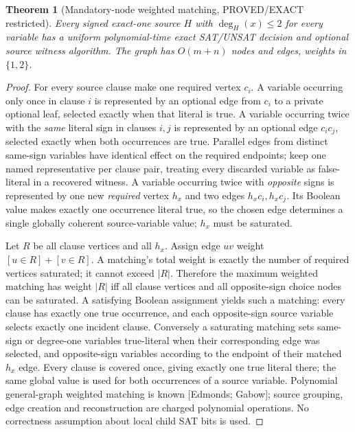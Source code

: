 \documentclass[11pt]{article}
\newtheorem{theorem}{Theorem}
\begin{document}
\begin{theorem}[Mandatory-node weighted matching, PROVED/EXACT restricted]
Every signed exact-one source $H$ with $\deg_H(x)\le2$ for every variable has a uniform polynomial-time exact SAT/UNSAT decision and optional source witness algorithm. The graph has $O(m+n)$ nodes and edges, weights in $\{1,2\}$.
\end{theorem}
\begin{proof}
For every source clause make one required vertex $c_i$. A variable occurring only once in clause $i$ is represented by an optional edge from $c_i$ to a private optional leaf, selected exactly when that literal is true. A variable occurring twice with the \emph{same} literal sign in clauses $i,j$ is represented by an optional edge $c_ic_j$, selected exactly when both occurrences are true. Parallel edges from distinct same-sign variables have identical effect on the required endpoints; keep one named representative per clause pair, treating every discarded variable as false-literal in a recovered witness. A variable occurring twice with \emph{opposite} signs is represented by one new \emph{required} vertex $h_x$ and two edges $h_xc_i,h_xc_j$. Its Boolean value makes exactly one occurrence literal true, so the chosen edge determines a single globally coherent source-variable value; $h_x$ must be saturated.

Let $R$ be all clause vertices and all $h_x$. Assign edge $uv$ weight $[u\in R]+[v\in R]$. A matching's total weight is exactly the number of required vertices saturated; it cannot exceed $|R|$. Therefore the maximum weighted matching has weight $|R|$ iff all clause vertices and all opposite-sign choice nodes can be saturated. A satisfying Boolean assignment yields such a matching: every clause has exactly one true occurrence, and each opposite-sign source variable selects exactly one incident clause. Conversely a saturating matching sets same-sign or degree-one variables true-literal when their corresponding edge was selected, and opposite-sign variables according to the endpoint of their matched $h_x$ edge. Every clause is covered once, giving exactly one true literal there; the same global value is used for both occurrences of a source variable. Polynomial general-graph weighted matching is known [Edmonds; Gabow]; source grouping, edge creation and reconstruction are charged polynomial operations. No correctness assumption about local child SAT bits is used.
\end{proof}
\end{document}
